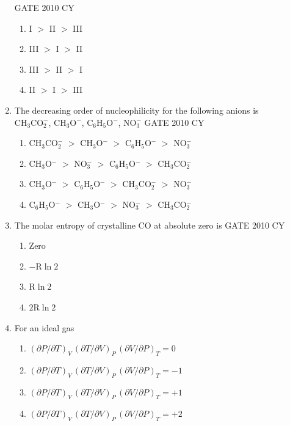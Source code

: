 \documentclass[journal,12pt,onecolumn]{IEEEtran}
\theoremstyle{remark}
\begin{document}
\begin{enumerate}
\hfill{GATE 2010 CY}

\begin{multicols}{2}
\begin{enumerate}
    \item I $>$ II $>$ III
    \item III $>$ I $>$ II
    \item III $>$ II $>$ I
    \item II $>$ I $>$ III
\end{enumerate}
\end{multicols}
\item The decreasing order of nucleophilicity for the following anions is\\
CH$_3$CO$_2^-$, CH$_3$O$^-$, C$_6$H$_5$O$^-$, NO$_3^-$
\hfill{GATE 2010 CY}

\begin{multicols}{2}
\begin{enumerate}
    \item CH$_3$CO$_2^-$ $>$ CH$_3$O$^-$ $>$ C$_6$H$_5$O$^-$ $>$ NO$_3^-$
    \item CH$_3$O$^-$ $>$ NO$_3^-$ $>$ C$_6$H$_5$O$^-$ $>$ CH$_3$CO$_2^-$
    \item CH$_3$O$^-$ $>$ C$_6$H$_5$O$^-$ $>$ CH$_3$CO$_2^-$ $>$ NO$_3^-$
    \item C$_6$H$_5$O$^-$ $>$ CH$_3$O$^-$ $>$ NO$_3^-$ $>$ CH$_3$CO$_2^-$
\end{enumerate}
\end{multicols}

\item The molar entropy of crystalline CO at absolute zero is
\hfill{GATE 2010 CY}

\begin{multicols}{2}
\begin{enumerate}
    \item Zero
    \item $-\mathrm{R}\ln2$
    \item $\mathrm{R}\ln2$
    \item $2\mathrm{R}\ln2$
\end{enumerate}
\end{multicols}

\item For an ideal gas
\begin{multicols}{2}
\begin{enumerate}
    \item $(\partial P/\partial T)_V\,(\partial T/\partial V)_P\,(\partial V/\partial P)_T = 0$
    \item $(\partial P/\partial T)_V\,(\partial T/\partial V)_P\,(\partial V/\partial P)_T = -1$
    \item $(\partial P/\partial T)_V\,(\partial T/\partial V)_P\,(\partial V/\partial P)_T = +1$
    \item $(\partial P/\partial T)_V\,(\partial T/\partial V)_P\,(\partial V/\partial P)_T = +2$
\end{enumerate}
\end{multicols}


\end{enumerate}
\end{document}
